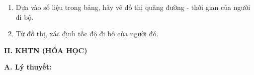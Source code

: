 \documentclass[11pt,a4paper]{article}
\begin{document}
\begin{enumerate}[label=\alph*.,leftmargin=1.5cm,itemsep=1pt]
  \item Dựa vào số liệu trong bảng, hãy vẽ đồ thị quãng đường - thời gian của người đi bộ.
  \item Từ đồ thị, xác định tốc độ đi bộ của người đó.
\end{enumerate}
\par\vspace{1pt}\noindent\dotfill\par\vspace{3pt}\noindent\dotfill\par\vspace{3pt}\noindent\dotfill\par\vspace{3pt}\noindent\dotfill\par\vspace{3pt}\noindent\dotfill\par\vspace{3pt}\noindent
\vspace{6pt}
{\color{myGreen}\large\bfseries II. KHTN (HÓA HỌC)}

\vspace{3pt}
{\color{mySub}\textbf{A. Lý thuyết:}}
\end{document}
